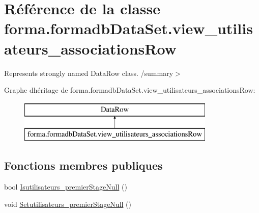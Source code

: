 \hypertarget{classforma_1_1formadb_data_set_1_1view__utilisateurs__associations_row}{}\section{Référence de la classe forma.\+formadb\+Data\+Set.\+view\+\_\+utilisateurs\+\_\+associations\+Row}
\label{classforma_1_1formadb_data_set_1_1view__utilisateurs__associations_row}


Represents strongly named Data\+Row class. /summary$>$  


Graphe d\textquotesingle{}héritage de forma.\+formadb\+Data\+Set.\+view\+\_\+utilisateurs\+\_\+associations\+Row\+:\begin{figure}[H]
\begin{center}
\leavevmode
\includegraphics[height=2.000000cm]{classforma_1_1formadb_data_set_1_1view__utilisateurs__associations_row}
\end{center}
\end{figure}
\subsection*{Fonctions membres publiques}
\begin{DoxyCompactItemize}
\item 
bool \hyperlink{classforma_1_1formadb_data_set_1_1view__utilisateurs__associations_row_aff399d86e36ec77bb599948077b81696}{Isutilisateurs\+\_\+premier\+Stage\+Null} ()
\item 
void \hyperlink{classforma_1_1formadb_data_set_1_1view__utilisateurs__associations_row_a8d474a88d5dd8affd34a80fc703b80ad}{Setutilisateurs\+\_\+premier\+Stage\+Null} ()
\end{DoxyCompactItemize}
